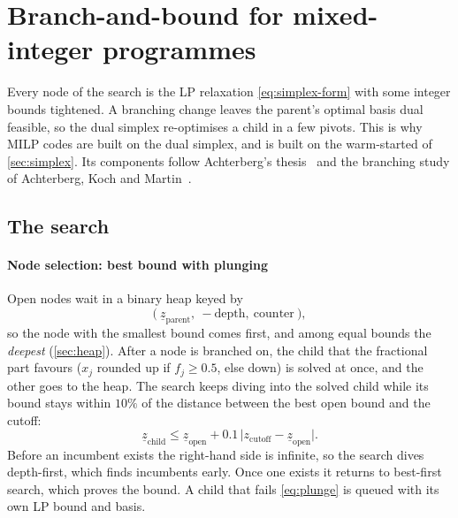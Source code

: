 \section{Branch-and-bound for mixed-integer programmes}\label{sec:mip}

Every node of the search is the LP relaxation \eqref{eq:simplex-form} with some integer bounds
tightened. A branching change leaves the parent's optimal basis dual feasible, so the dual simplex
re-optimises a child in a few pivots. This is why MILP codes are built on the dual simplex, and
 is built on the warm-started  of \cref{sec:simplex}. Its components
follow Achterberg's thesis~\cite{achterberg2007} and the branching study of Achterberg, Koch and
Martin~\cite{achterberg2005}.

\subsection{The search}
\paragraph{Node selection: best bound with plunging}
Open nodes wait in a binary heap keyed by
\begin{equation}\label{eq:heapkey}
  \bigl(\ \underline{z}_{\text{parent}},\ -\text{depth},\ \text{counter}\ \bigr),
\end{equation}
so the node with the smallest bound comes first, and among equal bounds the \emph{deepest}
(\cref{sec:heap}). After a node is branched on, the child that the fractional part favours ($x_j$
rounded up if $f_j\ge0.5$, else down) is solved at once, and the other goes to the heap. The search
keeps diving into the solved child while its bound stays within $10\%$ of the distance between the
best open bound and the cutoff:
\begin{equation}\label{eq:plunge}
  \underline z_{\text{child}} \le \underline z_{\text{open}} + 0.1\,\bigl|z_{\text{cutoff}}-\underline z_{\text{open}}\bigr| .
\end{equation}
Before an incumbent exists the right-hand side is infinite, so the search dives depth-first, which
finds incumbents early. Once one exists it returns to best-first search, which proves the bound.
A child that fails \eqref{eq:plunge} is queued with its own LP bound and basis.

